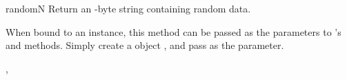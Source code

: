 \begin{funcdesc}{random}{N}
Return an -byte string containing random data.  

When bound to an instance, this method can be passed as the
 parameters to 's  and
 methods.  Simply create a  object
, and pass  as the parameter.
\end{funcdesc} 


\begin{seealso}
,
\end{seealso}

